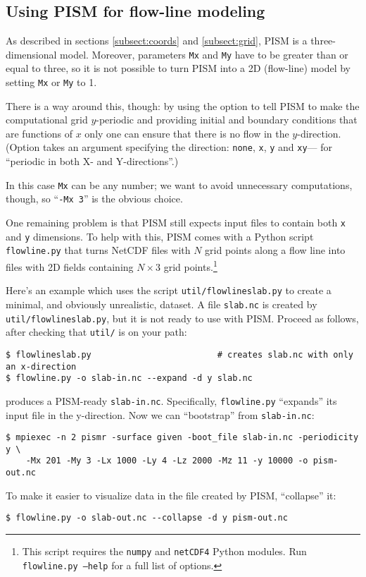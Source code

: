 \clearpage

\subsection{Using PISM for flow-line modeling}
\label{sec:flowline-modeling}

As described in sections \ref{subsect:coords} and \ref{subsect:grid}, PISM is a
three-dimensional model. Moreover, parameters
\texttt{Mx} and \texttt{My} have to be greater than or equal to three, so it is
not possible to turn PISM into a 2D (flow-line) model by setting \texttt{Mx} or
\texttt{My} to 1.

There is a way around this, though: by using the 
option to tell PISM to make the computational grid $y$-periodic and providing
initial and boundary conditions that are functions of $x$ only one can ensure
that there is no flow in the $y$-direction. (Option 
takes an argument specifying the direction: \texttt{none}, \texttt{x},
\texttt{y} and \texttt{xy}--- for ``periodic in both X- and Y-directions''.)

In this case \texttt{Mx} can be any number; we want to avoid unnecessary
computations, though, so ``\texttt{-Mx 3}'' is the obvious choice.

One remaining problem is that PISM still expects input files to contain both
\texttt{x} and \texttt{y} dimensions. To help with this, PISM comes with a
Python script \texttt{flowline.py} that turns NetCDF files with $N$ grid points
along a flow line into files with 2D fields containing $N\times3$ grid
points.\footnote{This script requires the \texttt{numpy} and
  \texttt{netCDF4} Python modules.  Run \texttt{flowline.py --help} for a
  full list of options.}

Here's an example which uses the script \texttt{util/flowlineslab.py} to create a minimal, and obviously unrealistic, dataset.  A file \texttt{slab.nc} is created by \texttt{util/flowlineslab.py}, but it is not ready to use with PISM.  Proceed as follows, after checking that \texttt{util/} is on your path:
\begin{verbatim}
$ flowlineslab.py                         # creates slab.nc with only an x-direction
$ flowline.py -o slab-in.nc --expand -d y slab.nc
\end{verbatim}
produces  a PISM-ready \texttt{slab-in.nc}.  Specifically, \texttt{flowline.py} ``expands'' its input file in the y-direction.  Now we can ``bootstrap'' from \texttt{slab-in.nc}:
\begin{verbatim}
$ mpiexec -n 2 pismr -surface given -boot_file slab-in.nc -periodicity y \
    -Mx 201 -My 3 -Lx 1000 -Ly 4 -Lz 2000 -Mz 11 -y 10000 -o pism-out.nc
\end{verbatim}
To make it easier to visualize data in the file created by PISM, ``collapse'' it:
\begin{verbatim}
$ flowline.py -o slab-out.nc --collapse -d y pism-out.nc
\end{verbatim}

